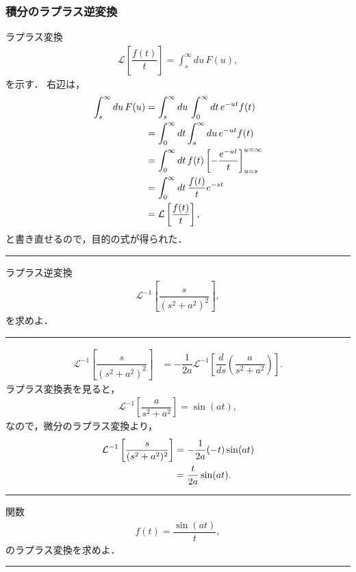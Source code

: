 \subsubsection{積分のラプラス逆変換}
%
ラプラス変換
\begin{align}
 \mathcal{L}\left[\dfrac{f(t)}{t}\right] = \int_{s}^{\infty}du\,F(u), 
\end{align}
を示す．
右辺は，
\begin{align}
 \int_{s}^{\infty}du\, F(u) 
    & = \int_{s}^{\infty}du\,\int_{0}^{\infty}dt\,e^{-ut}f(t) \notag \\
    & = \int_{0}^{\infty}dt\int_{s}^{\infty}du\, e^{-ut}f(t)  \notag \\
    & = \int_{0}^{\infty}dt\,f(t)\left[-\dfrac{e^{-ut}}{t}\right]_{u=s}^{u=\infty}\notag \\
    & = \int_{0}^{\infty}dt\,\dfrac{f(t)}{t}e^{-st} \notag \\
    & = \mathcal{L}\left[\dfrac{f(t)}{t}\right],
\end{align}
と書き直せるので，目的の式が得られた．
%
\newpage
%
\hrule
\reidai

ラプラス逆変換
\begin{align}
  \mathcal{L}^{-1}\left[\dfrac{s}{(s^2+a^2)^2}\right], 
\end{align}
を求めよ．
\vspace*{.2cm}
\hrule
\vspace*{.2cm}

\begin{align}
  \mathcal{L}^{-1}\left[\dfrac{s}{(s^2+a^2)^2}\right]
  &= -\dfrac{1}{2a}\mathcal{L}^{-1}\left[\dfrac{d}{ds}\left(\dfrac{a}{s^2+a^2}\right)\right].
\end{align}
ラプラス変換表を見ると，
\begin{align}
 \mathcal{L}^{-1}\left[\dfrac{a}{s^2+a^2}\right] = \sin(at), 
\end{align}
なので，微分のラプラス変換より，
\begin{align}
  \mathcal{L}^{-1}\left[\dfrac{s}{(s^2+a^2)^2}\right]
  &= -\dfrac{1}{2a}(-t)\sin(at) \notag \\
  &= \dfrac{t}{2a}\sin(at).
\end{align}
%
\newpage
%
\hrule
\reidai
関数
\begin{align}
 f(t) = \dfrac{\sin(at)}{t}, 
\end{align}
のラプラス変換を求めよ．
\vspace*{.2cm}
\hrule
\vspace*{.2cm}

